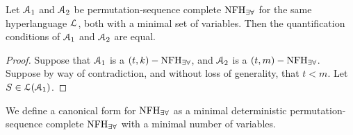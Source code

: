 {\begin{lemma}
Let $\mathcal{A}_1$ and $\mathcal{A}_2$ be permutation-sequence complete $\textrm{NFH}_{\exists\forall}$ for the same hyperlanguage $\cal L$, both with a minimal set of variables. Then the quantification conditions of $\mathcal{A}_1$ and $\mathcal{A}_2$ are equal.
\end{lemma}
\begin{proof}
Suppose that $\mathcal{A}_1$ is a $(t,k)-\textrm{NFH}_{\exists\forall}$, and $\mathcal{A}_2$ is a $(t,m)-\textrm{NFH}_{\exists\forall}$.
Suppose by way of contradiction, and without loss of generality, that $t < m$. 
Let $S\in\mathcal{L}(\mathcal{A}_1)$. 
\end{proof}

We define a canonical form for $\textrm{NFH}_{\exists\forall}$ as a minimal deterministic permutation-sequence complete $\textrm{NFH}_{\exists\forall}$ with a minimal number of variables. 


}%









